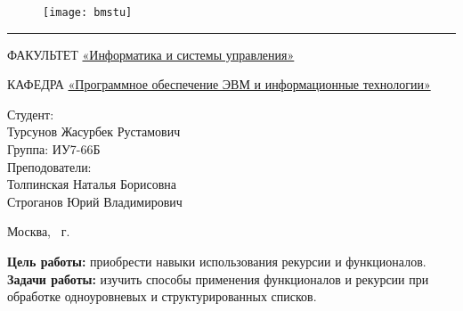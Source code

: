 \documentclass[a4paper, 12pt]{article}
\begin{document}
	
\begin{titlepage}
	\fontsize{12pt}{12pt}\selectfont
	\begin{figure}[t!]
		\centering
		\texttt{[image: bmstu]}
	\end{figure}
	
	\noindent\rule{15cm}{3pt}
	\newline\newline
	\noindent 
	ФАКУЛЬТЕТ 
	\underline{«Информатика и системы управления»} \newline\newline
	
	\noindent КАФЕДРА \underline{«Программное обеспечение ЭВМ и информационные технологии»}\newline\newline\newline\newline\newline
	
	\vspace{4mm}
	
	\vspace{8mm}
	
	
	\begin{flushright}
		{\small	Студент:\\ Турсунов Жасурбек Рустамович \\ Группа: ИУ7-66Б
			\vspace{3mm}
			\\Преподователи: \\ Толпинская Наталья Борисовна \\ Строганов Юрий Владимирович}
	\end{flushright}
	
	\begin{center}
		\vfill
		Москва, \the\year
		~г.
	\end{center}
\end{titlepage}

\tableofcontents
\clearpage
\newpage

\textbf{Цель работы:} приобрести навыки использования рекурсии и функционалов.
\\ \hspace*{5mm} \textbf{Задачи работы:} изучить способы применения функционалов и рекурсии при обработке одноуровневых и структурированных списков.
\end{document}
